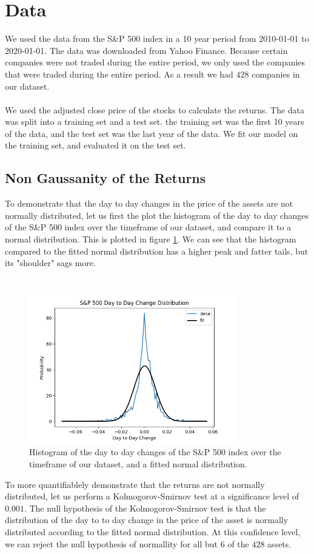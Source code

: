 \documentclass[10pt]{article}
\begin{document}
\section{Data}
We used the data from the S\&P 500 index in a 10 year period from 2010-01-01 to 2020-01-01. The data was downloaded from Yahoo Finance.
Because certain companies were not traded during the entire period, we only used the companies that were traded during the entire period. 
As a result we had $428$ companies in our dataset.\\\\
We used the adjusted close price of the stocks to calculate the returns. The data was split into a training set and a test set. the training 
set was the first 10 years of the data, and the test set was the last year of the data. We fit our model on the training set, and evaluated it on 
the test set. 
\subsection*{Non Gaussanity of the Returns}
To demonstrate that the day to day changes in the price of the assets are not normally distributed, let us first 
the plot the histogram of the day to day changes of the S\&P 500 index over the timeframe of our dataset, and compare it to a normal distribution. This is plotted in 
figure \ref{fig:histogram}. We can see that the histogram compared to the fitted normal distribution has 
a higher peak and fatter tails, but its "shoulder" sags more.\\\\
\begin{figure}[t]
    \centering
    \includegraphics[width=0.8\textwidth]{../day_to_day_change.png}
    \caption{Histogram of the day to day changes of the S\&P 500 index over the timeframe of our dataset, and a fitted normal distribution.}
    \label{fig:histogram}
\end{figure}
To more quantifiablely demonstrate that the returns are not normally distributed, let us perform a Kolmogorov-Smirnov test at 
a significance level of $0.001$. The null hypothesis of the Kolmogorov-Smirnov test is that the distribution of the 
day to to day change in the price of the asset is normally distributed according to the fitted normal distribution. At this confidence level,
we can reject the null hypothesis of normallity for all but $6$ of the $428$ assets. 
\end{document}

